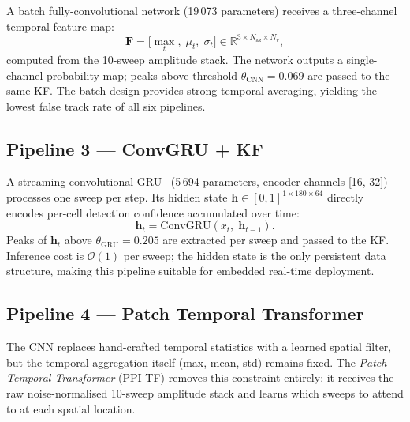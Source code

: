 \documentclass[conference]{IEEEtran}
\begin{document}
A batch fully-convolutional network (19\,073 parameters) receives a
three-channel temporal feature map:
\begin{equation}
  \mathbf{F} = \bigl[\max_t,\; \mu_t,\; \sigma_t\bigr]
  \in \mathbb{R}^{3 \times N_\mathrm{az} \times N_r},
  \label{eq:cnn_feat}
\end{equation}
computed from the 10-sweep amplitude stack.
The network outputs a single-channel probability map; peaks above threshold
$\theta_\mathrm{CNN} = 0.069$ are passed to the same KF.
The batch design provides strong temporal averaging, yielding the lowest
false track rate of all six pipelines.

\subsection{Pipeline 3 --- ConvGRU + KF}

A streaming convolutional GRU~\cite{Cho2014} (5\,694 parameters, encoder
channels [16, 32]) processes one sweep per step.
Its hidden state
$\mathbf{h} \in [0,1]^{1 \times 180 \times 64}$ directly encodes
per-cell detection confidence accumulated over time:
\begin{equation}
  \mathbf{h}_t = \mathrm{ConvGRU}(x_t,\; \mathbf{h}_{t-1}).
  \label{eq:gru}
\end{equation}
Peaks of $\mathbf{h}_t$ above $\theta_\mathrm{GRU} = 0.205$ are extracted
per sweep and passed to the KF.
Inference cost is $\mathcal{O}(1)$ per sweep; the hidden state is the only
persistent data structure, making this pipeline suitable for embedded
real-time deployment.

\subsection{Pipeline 4 --- Patch Temporal Transformer}

The CNN replaces hand-crafted temporal statistics with a learned spatial filter,
but the temporal aggregation itself (max, mean, std) remains fixed.
The \emph{Patch Temporal Transformer} (PPI-TF) removes this constraint entirely:
it receives the raw noise-normalised 10-sweep amplitude stack and learns which
sweeps to attend to at each spatial location.
\end{document}
